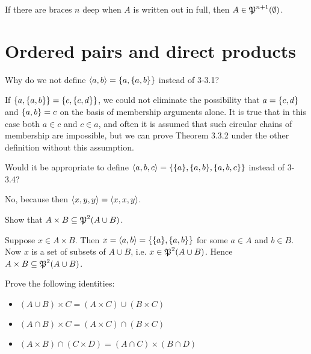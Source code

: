 \documentclass{report}
\begin{document}
\begin{solution}
If there are braces $n$ deep when $A$ is written out in full, then $A\in\operatorname{\mathfrak{P}}^{n+1}(\emptyset)$.
\end{solution}

\section{Ordered pairs and direct products}
\begin{exercise}
Why do we not define $\left\langle a,b\right\rangle = \left\{a, \left\{a,b\right\}\right\}$ instead of 3-3.1?
\end{exercise}

\begin{solution}
If $\left\{a, \left\{a,b\right\}\right\} = \left\{c, \left\{c,d\right\}\right\}$, we could not eliminate the possibility that $a = \left\{c,d\right\}$
and $\left\{a, b\right\} = c$ on the basis of membership arguments alone. It is true that in this case
both $a\in c$ and $c\in a$, and often it is assumed that such circular chains of membership
are impossible, but we can prove Theorem 3.3.2 under the other definition without this
assumption.
\end{solution}

\begin{exercise}
Would it be appropriate to define $\aprn{a,b,c} = \set{\set{a},\set{a,b},\set{a,b,c}}$ instead of 3-3.4?
\end{exercise}

\begin{solution}
    No, because then $\left\langle x,y,y\right\rangle=\left\langle x,x,y\right\rangle$.
\end{solution}

\begin{exercise}
Show that $A\times B\subseteq\operatorname{\mathfrak{P}}^2(A\cup B)$.
\end{exercise}

\begin{solution}
Suppose $x\in A\times B$. Then $x=\aprn{a,b}=\set{\set{a},\set{a,b}}$ for some $a\in A$ and $b\in B$.
Now $x$ is a set of subsets of $A\cup B$, i.e. $x\in\operatorname{\mathfrak{P}}^2(A\cup B)$.
Hence $A\times B\subseteq \operatorname{\mathfrak{P}}^2(A\cup B)$.
\end{solution}

\begin{exercise}
Prove the following identities:
\begin{itemize}
    \item $(A\cup B)\times C = (A\times C)\cup (B\times C)$
    \item $(A\cap B)\times C = (A\times C)\cap (B\times C)$
    \item $(A\times B)\cap (C\times D) = (A\cap C)\times (B\cap D)$
\end{itemize}
\end{exercise}
\end{document}
